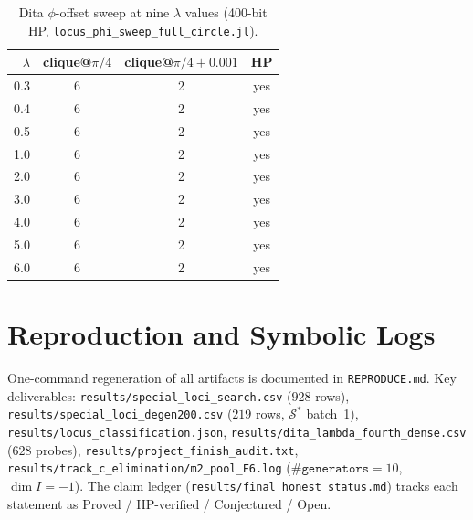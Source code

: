 \documentclass[onecolumn]{IEEEtran}
\newcommand{\repo}[1]{{\ttfamily\nolinkurl{#1}}}
\begin{document}
\begin{table}[h]
\caption{Dita $\phi$-offset sweep at nine $\lambda$ values (400-bit HP, \texttt{locus\_phi\_sweep\_full\_circle.jl}).}
\label{tab:phisweep}
\centering
\small
\begin{tabular}{@{}rccc@{}}
\toprule
$\lambda$ & clique@$\pi/4$ & clique@$\pi/4{+}0.001$ & HP \\
\midrule
0.3 & 6 & 2 & yes \\
0.4 & 6 & 2 & yes \\
0.5 & 6 & 2 & yes \\
1.0 & 6 & 2 & yes \\
2.0 & 6 & 2 & yes \\
3.0 & 6 & 2 & yes \\
4.0 & 6 & 2 & yes \\
5.0 & 6 & 2 & yes \\
6.0 & 6 & 2 & yes \\
\bottomrule
\end{tabular}
\end{table}

\section{Reproduction and Symbolic Logs}
\label{app:reproduce}
One-command regeneration of all artifacts is documented in \texttt{REPRODUCE.md}.
Key deliverables: \repo{results/special_loci_search.csv} ($928$ rows), \repo{results/special_loci_degen200.csv} ($219$ rows, $\mathcal{S}^*$ batch~1), \repo{results/locus_classification.json}, \repo{results/dita_lambda_fourth_dense.csv} ($628$ probes), \repo{results/project_finish_audit.txt}, \repo{results/track_c_elimination/m2_pool_F6.log} ($\texttt{\#generators}=10$, $\dim I=-1$).
The claim ledger (\repo{results/final_honest_status.md}) tracks each statement as Proved / HP-verified / Conjectured / Open.
\end{document}
